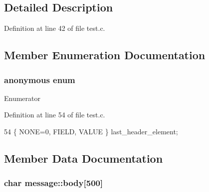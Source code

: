 \subsection{Detailed Description}


Definition at line 42 of file test.\+c.



\subsection{Member Enumeration Documentation}
\subsubsection[{anonymous enum}]{\setlength{\rightskip}{0pt plus 5cm}anonymous enum}\label{structmessage_a6d615760db2c7fe2a2cdb8b02228c1f5}
\begin{Desc}
\item[Enumerator]\par
\begin{description}
\item[{\em 
N\+O\+NE\label{structmessage_a6d615760db2c7fe2a2cdb8b02228c1f5a40651af2dd86e510b9c140b7bd31962f}
}]\item[{\em 
F\+I\+E\+LD\label{structmessage_a6d615760db2c7fe2a2cdb8b02228c1f5a7043641df320f601c81d13c895ec4e78}
}]\item[{\em 
V\+A\+L\+UE\label{structmessage_a6d615760db2c7fe2a2cdb8b02228c1f5a4eb76db28128a0078d8246246295a225}
}]\end{description}
\end{Desc}


Definition at line 54 of file test.\+c.


\begin{DoxyCode}
54 \{ NONE=0, FIELD, VALUE \} last_header_element;
\end{DoxyCode}


\subsection{Member Data Documentation}
\subsubsection[{body}]{\setlength{\rightskip}{0pt plus 5cm}char message\+::body[500]}\label{structmessage_ae2d1439bb4740d36249f4e5e69daa5b1}


